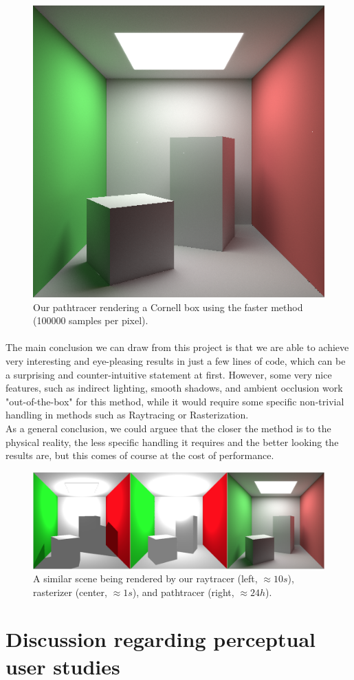 \documentclass[12pt, oneside]{report}
\begin{document}
\begin{figure}[h]
    \centering
    \includegraphics[width=0.55\linewidth]{big_100000.png} 
    \caption{Our pathtracer rendering a Cornell box using the faster method (100000 samples per pixel).}
    \label{fig:finalResult}
\end{figure}

\paragraph{}The main conclusion we can draw from this project is that we are able to achieve very interesting and eye-pleasing results in just a few lines of code, which can be a surprising and counter-intuitive statement at first. However, some very nice features, such as indirect lighting, smooth shadows, and ambient occlusion work "out-of-the-box" for this method, while it would require some specific non-trivial handling in methods such as Raytracing or Rasterization. \\ 
As a general conclusion, we could arguee that the closer the method is to the physical reality, the less specific handling it requires and the better looking the results are, but this comes of course at the cost of performance. 

\begin{figure}[h]
    \centering
    \includegraphics[width=1\linewidth]{methods_comparison.png} 
    \caption{A similar scene being rendered by our raytracer (left, $\approx 10s$), rasterizer (center, $\approx 1s$), and pathtracer (right, $\approx 24h$).}
    \label{fig:methodsComparison}
\end{figure}

\clearpage

\section*{Discussion regarding perceptual user studies}

{}



\end{document}

